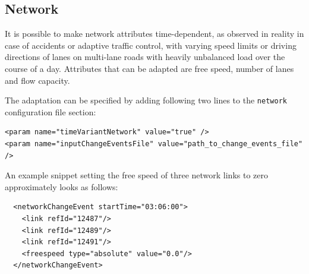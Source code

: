 
\subsection{Network}
\label{sec:network}
It is possible to make network attributes time-dependent, as observed in reality in case of accidents or adaptive traffic control, with varying speed limits or driving directions of lanes on multi-lane roads with heavily unbalanced load over the course of a day. Attributes that can be adapted are free speed, number of lanes and flow capacity.

The adaptation can be specified by adding following two lines to the \lstinline|network| configuration file section:
\begin{lstlisting}
<param name="timeVariantNetwork" value="true" />
<param name="inputChangeEventsFile" value="path_to_change_events_file" />
\end{lstlisting}
%
An example snippet setting the free speed of three network links to zero approximately looks as follows:
%
\begin{lstlisting}
  <networkChangeEvent startTime="03:06:00">
    <link refId="12487"/>
    <link refId="12489"/>
    <link refId="12491"/>
    <freespeed type="absolute" value="0.0"/>
  </networkChangeEvent>

\end{lstlisting}
%

